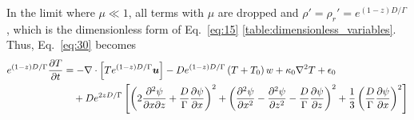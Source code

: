 \documentclass[document.tex]{subfiles}
\begin{document}
In the limit where $\mu \ll 1$, all terms with $\mu$ are dropped and $\rho' = \rho_r' = e^{(1-z)D/\Gamma}$, which is the dimensionless form of
 Eq.~\eqref{eq:15} \ref{table:dimensionless_variables}. Thus, Eq.~\eqref{eq:30} becomes
\begin{align}
    e^{(1-z)D/\Gamma} \pdv{T}{t}
  &= -\nabla\cdot\left[ Te^{(1-z)D/\Gamma} \bm{u} \right]
     - D e^{(1-z)D/\Gamma} \left( T + T_0 \right) w
     + \kappa_0 \nabla^{2} T + \epsilon_0 \notag\\
  &\quad + D e^{2zD/\Gamma}
  \left[
    \left( 2\pdv{\psi}{x}{z} + \frac{D}{\Gamma}\pdv{\psi}{x} \right)^{2}
  + \left( \pdv[2]{\psi}{x} - \pdv[2]{\psi}{z} - \frac{D}{\Gamma}\pdv{\psi}{z} \right)^{2}
  + \frac{1}{3}\left( \frac{D}{\Gamma}\pdv{\psi}{x} \right)^{2}
  \right]
\end{align} 
\end{document}
